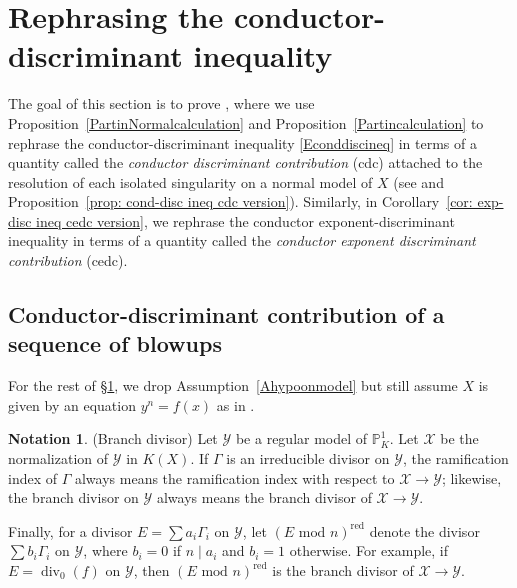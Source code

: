 \documentclass[12pt]{amsart}
\numberwithin{equation}{section}
\theoremstyle{definition}
\newtheorem{remark}[equation]{Remark}
\newtheorem{notation}[equation]{Notation}
\newcommand{\mc}[1]{\mathcal{#1}}
\renewcommand{\P}{\mathbb P}
\newcommand{\X}{\mathcal{X}}
\newcommand{\Y}{\mathcal{Y}}
\newcommand{\tx}[1]{\text{#1}}
\DeclareMathOperator{\divi}{div}
\DeclareMathOperator{\red}{red}
\begin{document}

\section{Rephrasing the conductor-discriminant inequality}\label{Srephrasing}
The goal of this section is to prove , where we use Proposition~\ref{PartinNormalcalculation} and
Proposition~\ref{Partincalculation} to
rephrase the conductor-discriminant inequality \eqref{Econddiscineq}
in terms of a quantity called the \emph{conductor
  discriminant contribution} (cdc) attached to the resolution of each
isolated singularity on a normal model of $X$ (see  and
Proposition~\ref{prop: cond-disc ineq cdc version}).  Similarly, in
Corollary~\ref{cor: exp-disc ineq cedc version}, we rephrase the
conductor exponent-discriminant inequality in terms of a quantity
called the \emph{conductor exponent discriminant contribution} (cedc).

\subsection{Conductor-discriminant contribution of a sequence of blowups}

For the rest of \S\ref{Srephrasing}, we drop
Assumption~\ref{Ahypoonmodel} but still assume $X$ is given by an equation $y^n = f(x)$ as in .

\begin{notation}\label{notation: divisor notations}(Branch divisor)
    Let $\Y$ be a regular model of $\P^1_{K}$. Let $\X$ be the normalization of $\Y$ in $K(X)$. If $\Gamma$ is an irreducible divisor on $\Y$, the ramification index of $\Gamma$ always means the ramification index with respect to $\X \rightarrow \Y$; likewise, the branch divisor on $\Y$ always means the branch divisor of $\X \rightarrow \Y$.  
    
    Finally, for a divisor $E=\sum a_i\Gamma_i$ on $\Y$, let $(E\tx{ mod }n)^{\red}$ denote the divisor $\sum b_i\Gamma_i$ on $\Y$, where $b_i=0$ if $n\mid a_i$ and $b_i=1$ otherwise. For example, if $E=\divi_0(f)$ on $\Y$, then $(E\tx{ mod }n)^{\red}$ is the branch divisor of $\X\to\Y$.
\end{notation}
\end{document}
